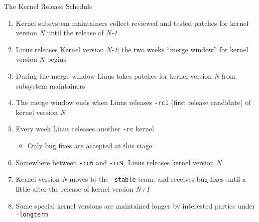 \documentclass{beamer}
\begin{document}
\begin{frame}{The Kernel Release Schedule}
  \begin{enumerate}
  \item Kernel subsystem maintainers collect reviewed and tested
    patches for kernel version \emph{N} until the release of
    \emph{N-1}.
  \item Linus releases Kernel version \emph{N-1}; the two weeks
    ``merge window'' for kernel version \emph{N} begins
  \item During the merge window Linus takes patches for kernel version
    \emph{N} from subsystem maintainers
  \item The merge window ends when Linus releases \texttt{-rc1} (first
    release candidate) of kernel version \emph{N}
  \item Every week Linus releases another \texttt{-rc} kernel
    \begin{itemize}
    \item Only bug fixes are accepted at this stage
    \end{itemize}
  \item Somewhere between \texttt{-rc6} and \texttt{-rc9}, Linus
    releases kernel version \emph{N}
  \item Kernel version \emph{N} moves to the \texttt{-stable} team,
    and receives bug fixes until a little after the release of kernel
    version \emph{N+1}
  \item Some special kernel versions are maintained longer by
    interested parties under \texttt{-longterm}
  \end{enumerate}
\end{frame}
\end{document}
